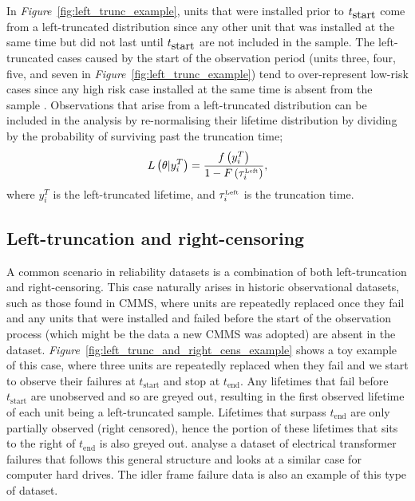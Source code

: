 In \textit{Figure}~\ref{fig:left_trunc_example}, units that were installed prior to $t_{\hbox{start}}$ come from a left-truncated distribution since any other unit that was installed at the same time but did not last until $t_{\hbox{start}}$ are not included in the sample. The left-truncated cases caused by the start of the observation period (units three, four, five, and seven in \textit{Figure}~\ref{fig:left_trunc_example}) tend to over-represent low-risk cases since any high risk case installed at the same time is absent from the sample \citep{guo1993}. Observations that arise from a left-truncated distribution can be included in the analysis by re-normalising their lifetime distribution by dividing by the probability of surviving past the truncation time;
\begin{equation}
    \label{eq:left_trunc}
    L\left(\theta|y^T_i\right) = \frac{f\left(y^T_i\right)}{1 - F\left(\tau^{\hbox{\tiny{Left}}}_i\right)},
\end{equation}
where $y^T_i$ is the left-truncated lifetime, and $\tau^{\hbox{\tiny{Left}}}_i$ is the truncation time.

\subsection{Left-truncation and right-censoring} 

A common scenario in reliability datasets is a combination of both left-truncation and right-censoring. This case naturally arises in historic observational datasets, such as those found in CMMS, where units are repeatedly replaced once they fail and any units that were installed and failed before the start of the observation process (which might be the data a new CMMS was adopted) are absent in the dataset. \textit{Figure}~\ref{fig:left_trunc_and_right_cens_example} shows a toy example of this case, where three units are repeatedly replaced when they fail and we start to observe their failures at $t_{\text{start}}$ and stop at $t_{\text{end}}$. Any lifetimes that fail before $t_{\text{start}}$ are unobserved and so are greyed out, resulting in the first observed lifetime of each unit being a left-truncated sample. Lifetimes that surpass $t_{\text{end}}$ are only partially observed (right censored), hence the portion of these lifetimes that sits to the right of $t_{\text{end}}$ is also greyed out. \citet{hong2009,mitra2013,kundu2016} analyse a dataset of electrical transformer failures that follows this general structure and \citet{mittman2013} looks at a similar case for computer hard drives. The idler frame failure data is also an example of this type of dataset.

